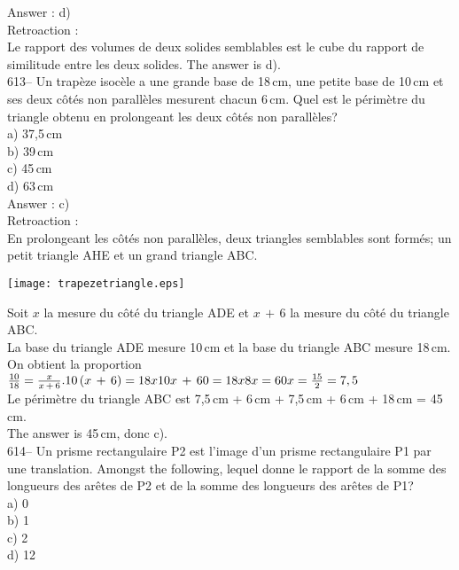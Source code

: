 ﻿\documentclass[letterpaper, 12pt]{article}
\begin{document}
Answer : d)\\

Retroaction : \\
Le rapport des volumes de deux solides semblables est le cube du rapport de
similitude entre les deux solides.  The answer is d).\\

613-- Un trap\`eze isoc\`ele a une grande base de 18\,cm, une petite base de
10\,cm et ses deux c\^ot\'es non parall\`eles mesurent chacun 6\,cm.  Quel
est le p\'erim\`etre du triangle obtenu en prolongeant les deux c\^ot\'es
non parall\`eles?\\
a) 37,5\,cm\\
b) 39\,cm\\
c) 45\,cm\\
d) 63\,cm\\

Answer : c)\\

Retroaction : \\
En prolongeant les c\^ot\'es non parall\`eles, deux triangles semblables
sont form\'es; un petit triangle AHE et un grand triangle ABC.\\
    \begin{center}
    \texttt{[image: trapezetriangle.eps]}
    \end{center}

Soit $x$ la mesure du c\^ot\'e du triangle ADE et $x\,+\,6$ la mesure du
c\^ot\'e du triangle ABC.  \\
La base du triangle ADE mesure 10\,cm et la base du triangle ABC mesure
18\,cm.\\[2mm]
On obtient la proportion $\frac{10}{18}=\frac{x}{x\,+\,6}.\\[2mm]
10\left( x\,+\,6\right) =18x\\[2mm]
10x\,+\,60=18x\\[2mm]
8x=60\\[2mm]
x=\frac{15}{2}=7,5$\\[2mm]
Le p\'erim\`etre du triangle ABC est 7,5\,cm + 6\,cm + 7,5\,cm + 6\,cm +
18\,cm = 45\,cm.\\[2mm]
The answer is 45\,cm, donc c).\\

614-- Un prisme rectangulaire P2 est l'image d'un prisme rectangulaire P1
par une translation.  Amongst the following, lequel donne le
rapport de la somme des longueurs des ar\^etes de P2 et de la somme des
longueurs des ar\^etes de P1?\\
a) 0\\
b) 1\\
c) 2\\
d) 12\\
\end{document}

